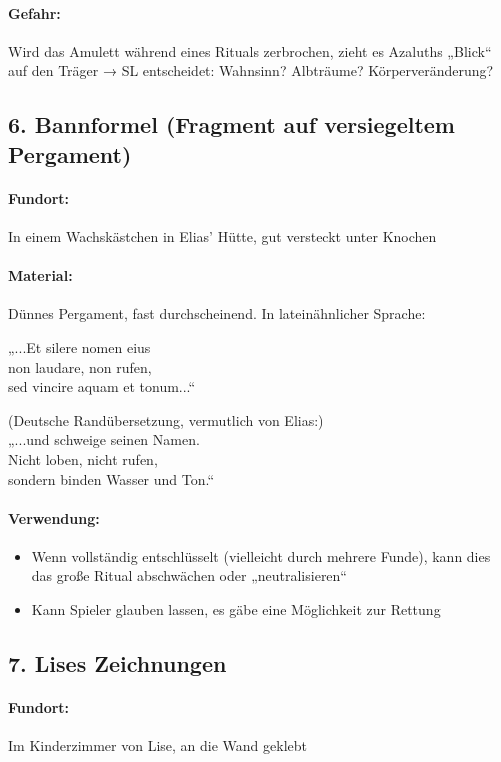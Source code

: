 \paragraph{Gefahr:}
Wird das Amulett während eines Rituals zerbrochen, zieht es Azaluths „Blick“ auf den Träger → SL entscheidet: Wahnsinn? Albträume? Körperveränderung?

\subsection*{6. Bannformel (Fragment auf versiegeltem Pergament)}
\paragraph{Fundort:} In einem Wachskästchen in Elias' Hütte, gut versteckt unter Knochen
\paragraph{Material:} Dünnes Pergament, fast durchscheinend. In lateinähnlicher Sprache:
\begin{displayquote}
„...Et silere nomen eius\\
non laudare, non rufen,\\
sed vincire aquam et tonum...“
\end{displayquote}
\begin{displayquote}
(Deutsche Randübersetzung, vermutlich von Elias:)\\
„...und schweige seinen Namen.\\
Nicht loben, nicht rufen,\\
sondern binden Wasser und Ton.“
\end{displayquote}
\paragraph{Verwendung:}
\begin{itemize}
\item Wenn vollständig entschlüsselt (vielleicht durch mehrere Funde), kann dies das große Ritual abschwächen oder „neutralisieren“
\item Kann Spieler glauben lassen, es gäbe eine Möglichkeit zur Rettung
\end{itemize}

\subsection*{7. Lises Zeichnungen}
\paragraph{Fundort:} Im Kinderzimmer von Lise, an die Wand geklebt
